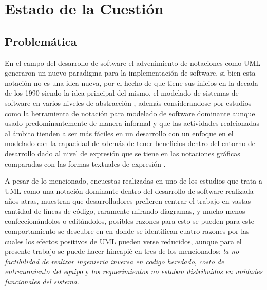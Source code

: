 \chapter{Estado de la Cuestión}%
\label{sec:estadodelacuestion}

\section{Problemática}
\label{sec:problematica}
En el campo del desarrollo de software el advenimiento de notaciones como UML
generaron un nuevo paradigma para la implementación de software, si bien esta
notación no es una idea nueva, por el hecho de que tiene sus inicios en la decada de los
1990 siendo la idea principal del mismo, el modelado de sistemas de software en
varios niveles de abstracción  \cite{chaudron2017}, además considerandose por
estudios como la herramienta de notación para modelado de software dominante
\cite{aldaeej2016} aunque usado predominantemente de manera informal y que las
actividades realcionadas al ámbito tienden a ser
más fáciles en un desarrollo con un enfoque en el modelado \cite{forward2010}
con la capacidad de además de tener beneficios dentro del entorno de desarrollo
dado al nivel de expresión que se tiene en las
notaciones gráficas comparadas con las formas textuales de expresión
\cite{rumpe2004}.

A pesar de lo mencionado, encuestas realizadas en uno de los estudios que trata
a UML como una notación dominante dentro del desarrollo de software realizada años
atras, muestran que desarrolladores prefieren centrar el trabajo en vastas
cantidad de líneas de código, raramente mirando diagramas, y mucho menos
confeccionándolos o editándolos, posibles razones para esto se pueden para este
comportamiento se descubre en \cite{bente2006} en donde se identifican cuatro
razones por las cuales los efectos positivos de UML pueden verse reducidos,
aunque para el presente trabajo se puede hacer hincapié en tres de los
mencionados:
\textit{la no-factibilidad de realizar ingenieria inversa en codigo heredado},
\textit{costo de entrenamiento del equipo} y \textit{los requerimientos no
estaban distribuidos en unidades funcionales del sistema}.

